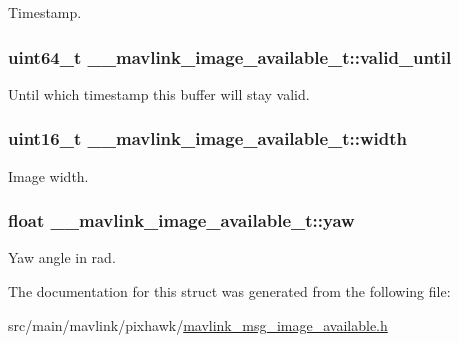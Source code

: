 Timestamp. 

\hypertarget{struct____mavlink__image__available__t_af17ddf110570d8aa5530b54e9dae1b15}{
\subsubsection[{valid\+\_\+until}]{\setlength{\rightskip}{0pt plus 5cm}uint64\+\_\+t \+\_\+\+\_\+mavlink\+\_\+image\+\_\+available\+\_\+t\+::valid\+\_\+until}}\label{struct____mavlink__image__available__t_af17ddf110570d8aa5530b54e9dae1b15}


Until which timestamp this buffer will stay valid. 

\hypertarget{struct____mavlink__image__available__t_a577f2cf7105af75a14301b7d238f6a4e}{
\subsubsection[{width}]{\setlength{\rightskip}{0pt plus 5cm}uint16\+\_\+t \+\_\+\+\_\+mavlink\+\_\+image\+\_\+available\+\_\+t\+::width}}\label{struct____mavlink__image__available__t_a577f2cf7105af75a14301b7d238f6a4e}


Image width. 

\hypertarget{struct____mavlink__image__available__t_a804cfe3215d4b9eca8f0640cad24af83}{
\subsubsection[{yaw}]{\setlength{\rightskip}{0pt plus 5cm}float \+\_\+\+\_\+mavlink\+\_\+image\+\_\+available\+\_\+t\+::yaw}}\label{struct____mavlink__image__available__t_a804cfe3215d4b9eca8f0640cad24af83}


Yaw angle in rad. 



The documentation for this struct was generated from the following file\+:\begin{DoxyCompactItemize}
\item 
src/main/mavlink/pixhawk/\hyperlink{mavlink__msg__image__available_8h}{mavlink\+\_\+msg\+\_\+image\+\_\+available.\+h}\end{DoxyCompactItemize}
